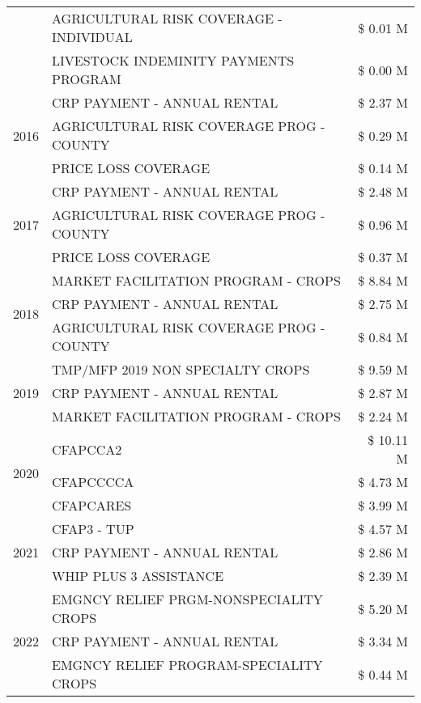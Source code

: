 \begin{tabular}{llr}
 & AGRICULTURAL RISK COVERAGE - INDIVIDUAL & \$ 0.01 M \\
 & LIVESTOCK INDEMINITY PAYMENTS PROGRAM & \$ 0.00 M \\
\cline{1-3}
\multirow[t]{3}{*}{2016} & CRP PAYMENT - ANNUAL RENTAL & \$ 2.37 M \\
 & AGRICULTURAL RISK COVERAGE PROG - COUNTY & \$ 0.29 M \\
 & PRICE LOSS COVERAGE & \$ 0.14 M \\
\cline{1-3}
\multirow[t]{3}{*}{2017} & CRP PAYMENT - ANNUAL RENTAL & \$ 2.48 M \\
 & AGRICULTURAL RISK COVERAGE PROG - COUNTY & \$ 0.96 M \\
 & PRICE LOSS COVERAGE & \$ 0.37 M \\
\cline{1-3}
\multirow[t]{3}{*}{2018} & MARKET FACILITATION PROGRAM - CROPS & \$ 8.84 M \\
 & CRP PAYMENT - ANNUAL RENTAL & \$ 2.75 M \\
 & AGRICULTURAL RISK COVERAGE PROG - COUNTY & \$ 0.84 M \\
\cline{1-3}
\multirow[t]{3}{*}{2019} & TMP/MFP 2019 NON SPECIALTY CROPS & \$ 9.59 M \\
 & CRP PAYMENT - ANNUAL RENTAL & \$ 2.87 M \\
 & MARKET FACILITATION PROGRAM - CROPS & \$ 2.24 M \\
\cline{1-3}
\multirow[t]{3}{*}{2020} & CFAPCCA2 & \$ 10.11 M \\
 & CFAPCCCCA & \$ 4.73 M \\
 & CFAPCARES & \$ 3.99 M \\
\cline{1-3}
\multirow[t]{3}{*}{2021} & CFAP3 - TUP & \$ 4.57 M \\
 & CRP PAYMENT - ANNUAL RENTAL & \$ 2.86 M \\
 & WHIP PLUS 3 ASSISTANCE & \$ 2.39 M \\
\cline{1-3}
\multirow[t]{3}{*}{2022} & EMGNCY RELIEF PRGM-NONSPECIALITY CROPS & \$ 5.20 M \\
 & CRP PAYMENT - ANNUAL RENTAL & \$ 3.34 M \\
 & EMGNCY RELIEF PROGRAM-SPECIALITY CROPS & \$ 0.44 M \\
\cline{1-3}
\bottomrule
\end{tabular}
